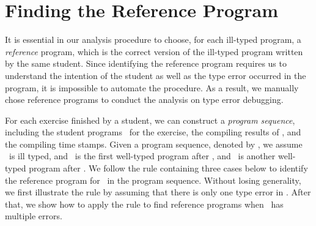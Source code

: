 \documentclass[12pt]{report}	%
\begin{document}
\section{Finding the Reference Program}
\label{sec:subject:ref}

It is essential in our analysis procedure to choose,
for each ill-typed program,
a \emph{reference} program, which is the correct version of
the ill-typed program written by the same student.
Since identifying the reference program requires us to
understand the intention of the student
as well as the type error occurred in the program, it is impossible
to automate the procedure.
As a result, we manually chose reference programs
to conduct the analysis on type error debugging.


%



For each exercise finished by a student, we can
construct a \emph{program sequence},
including the student programs \ for the exercise,
the compiling results of , and the compiling time stamps.
%
%
Given a program sequence, denoted by \sseqijk,
we assume \pgi\ is ill typed, 
and \pgj\ is the first well-typed program after \pgi, 
and \pgk\ is another well-typed program after \pgj.
We follow the rule containing three cases below to
identify the reference program for \pgi\ in
the program sequence.
Without losing generality, we first illustrate the rule
by assuming that there is only one type error in \pgi.
After that, we show how to apply the rule to
find reference programs when \pgi\ has multiple errors.

\end{document}
